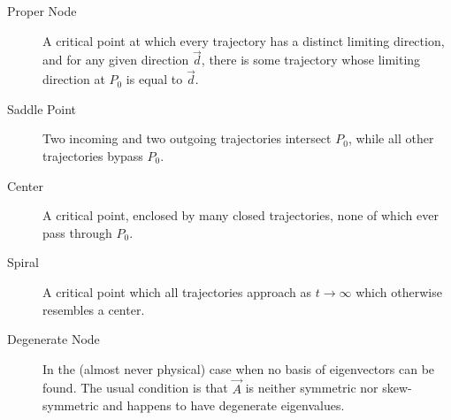 \begin{description}
    \item[Proper Node] A critical point at which every trajectory has a distinct
        limiting direction, and for any given direction $ \vec{d} $, there is some
        trajectory whose limiting direction at $ P_0 $ is equal to $ \vec{d} $.
    \item[Saddle Point] Two incoming and two outgoing trajectories intersect $ P_0 $,
        while all other trajectories bypass $ P_0 $.
    \item[Center] A critical point, enclosed by many closed trajectories, none of
        which ever pass through $ P_0 $.
    \item[Spiral] A critical point which all trajectories approach as
        $ t \rightarrow \infty $ which otherwise resembles a center.
    \item[Degenerate Node] In the (almost never physical) case when no basis of
        eigenvectors can be found. The usual condition is that $ \vec{A} $ is neither
        symmetric nor skew-symmetric and happens to have degenerate eigenvalues.
        \begin{figure}[H]
            \centering
            \begin{subfigure}[b]{0.49\textwidth}
\end{subfigure}
\end{figure}
\end{description}
